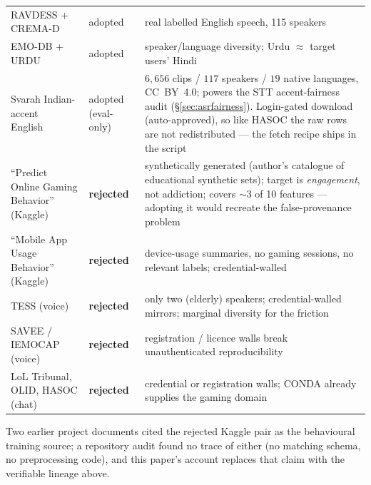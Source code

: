 \documentclass[11pt,a4paper]{article}
\begin{document}
\begin{center}
\begin{tabularx}{\linewidth}{p{3.4cm}p{1.7cm}X}
RAVDESS + CREMA-D & adopted & real labelled English speech, 115 speakers \\
EMO-DB + URDU & adopted & speaker/language diversity; Urdu $\approx$ target users' Hindi \\
Svarah Indian-accent English~\cite{svarah2023} & adopted (eval-only) & $6{,}656$ clips / $117$ speakers / $19$ native languages, CC~BY~4.0; powers the STT accent-fairness audit (\S\ref{sec:asrfairness}). Login-gated download (auto-approved), so like HASOC the raw rows are not redistributed --- the fetch recipe ships in the script \\
\addlinespace
``Predict Online Gaming Behavior'' (Kaggle) & \textbf{rejected} & synthetically generated (author's catalogue of educational synthetic sets); target is \emph{engagement}, not addiction; covers $\sim$3 of 10 features --- adopting it would recreate the false-provenance problem \\
``Mobile App Usage Behavior'' (Kaggle) & \textbf{rejected} & device-usage summaries, no gaming sessions, no relevant labels; credential-walled \\
TESS (voice) & \textbf{rejected} & only two (elderly) speakers; credential-walled mirrors; marginal diversity for the friction \\
SAVEE / IEMOCAP (voice) & \textbf{rejected} & registration / licence walls break unauthenticated reproducibility \\
LoL Tribunal, OLID, HASOC (chat) & \textbf{rejected} & credential or registration walls; CONDA already supplies the gaming domain \\
\bottomrule
\end{tabularx}
\end{center}
Two earlier project documents cited the rejected Kaggle pair as the behavioural
training source; a repository audit found no trace of either (no matching schema, no
preprocessing code), and this paper's account replaces that claim with the verifiable
lineage above.
\end{document}
